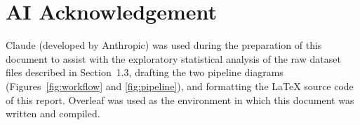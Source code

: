 \documentclass[11pt]{article}
\begin{document}


\section*{AI Acknowledgement}

Claude (developed by Anthropic) was used during the preparation of this document to assist with the exploratory statistical analysis of the raw dataset files described in Section~1.3, drafting the two pipeline diagrams (Figures~\ref{fig:workflow} and \ref{fig:pipeline}), and formatting the \LaTeX{} source code of this report. Overleaf was used as the environment in which this document was written and compiled.
\end{document}
